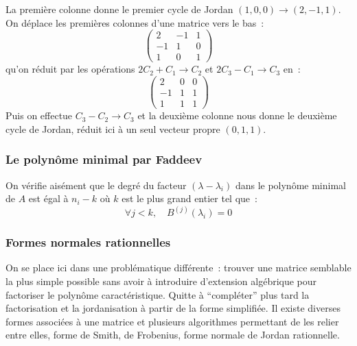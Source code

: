 \documentclass[a4paper,11pt]{article}
\begin{document}
La premi\`ere colonne donne le premier cycle de Jordan
 $(1,0,0) \rightarrow (2,-1,1)$.
On d\'eplace les premi\`eres colonnes d'une matrice vers le bas~:
\[ \left(\begin{array}{ccc}
2 & -1 & 1 \\
-1 & 1 & 0 \\
1 & 0 & 1 
\end{array}\right) \]
qu'on r\'eduit par les op\'erations $2C_2 +C_1 \rightarrow C_2$ et
$2C_3-C_1\rightarrow C_3$ en~:
\[ \left(\begin{array}{ccc}
2 & 0 & 0 \\
-1 & 1 & 1 \\
1 & 1 & 1 
\end{array}\right) \]
Puis on effectue $C_3-C_2 \rightarrow C_3$ et la deuxi\`eme colonne
nous donne le deuxi\`eme cycle de Jordan, r\'eduit ici \`a un
seul vecteur propre $(0,1,1)$.

\subsubsection{Le polyn\^ome minimal par Faddeev}
On v\'erifie ais\'ement que le degr\'e du facteur 
$(\lambda-\lambda_i)$ dans le polyn\^ome minimal de $A$ est \'egal
\`a $n_i-k$ o\`u $k$ est le plus grand entier tel que~:
\[ \forall j<k, \quad B^{(j)}(\lambda_i)=0 \]

\subsubsection{Formes normales rationnelles}
On se place ici dans une probl\'ematique diff\'erente~: trouver une matrice
semblable la plus simple possible sans avoir \`a introduire d'extension
alg\'ebrique pour factoriser le polyn\^ome caract\'eristique.
Quitte \`a ``compl\'eter'' plus tard la factorisation et la jordanisation \`a
partir de la forme simplifi\'ee. Il existe diverses formes associées
à une matrice et plusieurs algorithmes permettant de les relier entre elles,
forme de Smith, de Frobenius, forme normale de Jordan rationnelle.
\end{document}
